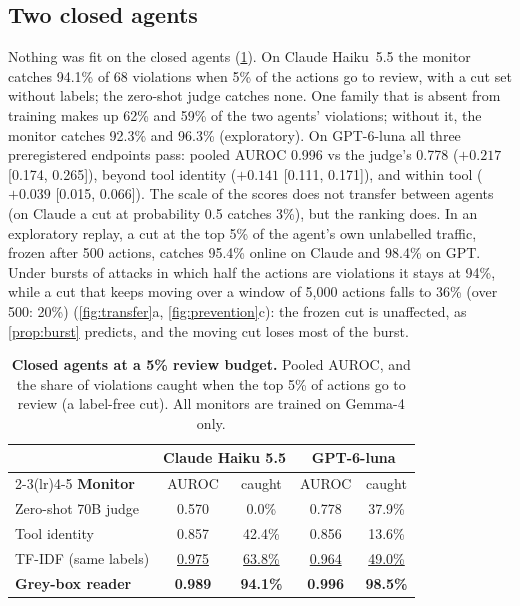 \documentclass{article}
\theoremstyle{plain}
\theoremstyle{definition}
\begin{document}
\subsection{Two closed agents}
\label{sec:closed}
Nothing was fit on the closed agents (\cref{tab:closed}). On Claude Haiku~5.5 the monitor catches 94.1\% of 68 violations when 5\% of the actions go to review, with a cut set without labels; the zero-shot judge catches none. One family that is absent from training makes up 62\% and 59\% of the two agents' violations; without it, the monitor catches 92.3\% and 96.3\% (exploratory). On GPT-6-luna all three preregistered endpoints pass: pooled AUROC 0.996 vs the judge's 0.778 ($+0.217$ [0.174, 0.265]), beyond tool identity ($+0.141$ [0.111, 0.171]), and within tool ($+0.039$ [0.015, 0.066]).
The scale of the scores does not transfer between agents (on Claude a cut at probability 0.5 catches 3\%), but the ranking does. In an exploratory replay, a cut at the top 5\% of the agent's own unlabelled traffic, frozen after 500 actions, catches 95.4\% online on Claude and 98.4\% on GPT. Under bursts of attacks in which half the actions are violations it stays at 94\%, while a cut that keeps moving over a window of 5{,}000 actions falls to 36\% (over 500: 20\%) (\cref{fig:transfer}a, \cref{fig:prevention}c): the frozen cut is unaffected, as \cref{prop:burst} predicts, and the moving cut loses most of the burst.

\begin{table}[t]
\centering\small
\renewcommand{\arraystretch}{1.15}\setlength{\tabcolsep}{4.5pt}
\caption{\textbf{Closed agents at a 5\% review budget.} Pooled AUROC, and the share of violations caught when the top 5\% of actions go to review (a label-free cut). All monitors are trained on Gemma-4 only.}
\label{tab:closed}
\begin{tabular}{@{}lcccc@{}}
\toprule
 & \multicolumn{2}{c}{\textbf{Claude Haiku 5.5}} & \multicolumn{2}{c}{\textbf{GPT-6-luna}}\\
\cmidrule(lr){2-3}\cmidrule(lr){4-5}
\textbf{Monitor} & AUROC & caught & AUROC & caught\\
\midrule
Zero-shot 70B judge & 0.570 & 0.0\% & 0.778 & 37.9\%\\
Tool identity & 0.857 & 42.4\% & 0.856 & 13.6\%\\
TF-IDF (same labels) & \underline{0.975} & \underline{63.8\%} & \underline{0.964} & \underline{49.0\%}\\
\rowcolor{gbrow}\textbf{Grey-box reader} & \textbf{0.989} & \textbf{94.1\%} & \textbf{0.996} & \textbf{98.5\%}\\
\bottomrule
\end{tabular}
\end{table}
\end{document}
